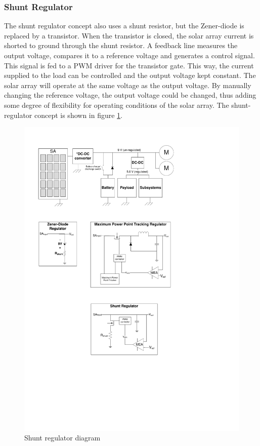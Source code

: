 \subsubsection*{Shunt Regulator}
The shunt regulator concept also uses a shunt resistor, but the Zener-diode is replaced by a transistor. When the transistor is closed, the solar array current is shorted to ground through the shunt resistor. A feedback line measures the output voltage, compares it to a reference voltage and generates a control signal. This signal is fed to a \ac{PWM} driver for the transistor gate. This way, the current supplied to the load can be controlled and the output voltage kept constant. The solar array will operate at the same voltage as the output voltage. By manually changing the reference voltage, the output voltage could be changed, thus adding some degree of flexibility for operating conditions of the solar array. The shunt-regulator concept is shown in figure \ref{fig:shunt_regulator}.
%
\begin{figure}[H]
\centering
\includegraphics[scale=1]{figures/fig_PDR_Shunt_Regulator}
\caption{Shunt regulator diagram}
\label{fig:shunt_regulator}
\end{figure}
%
